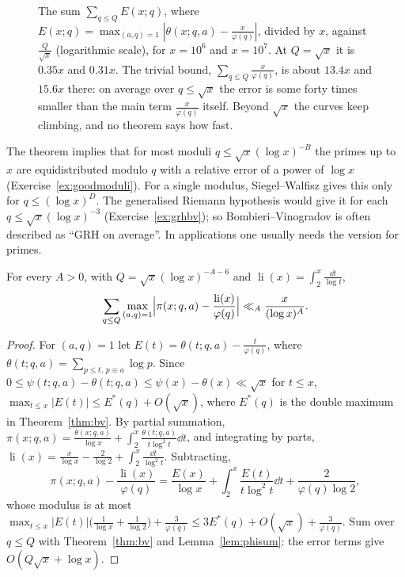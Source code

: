 \begin{figure}[ht]
\centering
{}
\caption{The sum $\sum_{q\le Q}E(x;q)$, where $E(x;q)=\max_{(a,q)=1}|\theta(x;q,a)-\frac x{\varphi(q)}|$, divided by $x$, against $\frac Q{\sqrt x}$ (logarithmic scale), for $x=10^6$ and $x=10^7$. At $Q=\sqrt x$ it is $0.35x$ and $0.31x$. The trivial bound, $\sum_{q\le Q}\frac x{\varphi(q)}$, is about $13.4x$ and $15.6x$ there: on average over $q\le\sqrt x$ the error is some forty times smaller than the main term $\frac x{\varphi(q)}$ itself. Beyond $\sqrt x$ the curves keep climbing, and no theorem says how fast.}
\label{fig:bv}
\end{figure}

The theorem implies that for most moduli $q\le\sqrt x(\log x)^{-B}$ the primes up to $x$ are equidistributed modulo $q$ with a relative error of a power of $\log x$ (Exercise~\ref{ex:goodmoduli}). For a single modulus, Siegel--Walfisz gives this only for $q\le(\log x)^D$. The generalised Riemann hypothesis would give it for each $q\le\sqrt x(\log x)^{-3}$ (Exercise~\ref{ex:grhbv}); so Bombieri--Vinogradov is often described as ``GRH on average''. In applications one usually needs the version for primes.

\begin{corollary}\label{cor:bvpi}
For every $A>0$, with $Q=\sqrt x(\log x)^{-A-6}$ and $\operatorname{li}(x)=\int_2^x\frac{\dd t}{\log t}$,
\[
\sum_{q\le Q}\max_{(a,q)=1}\Bigl|\pi(x;q,a)-\frac{\operatorname{li}(x)}{\varphi(q)}\Bigr|\ll_A\frac x{(\log x)^A}.
\]
\end{corollary}
\begin{proof}
For $(a,q)=1$ let $E(t)=\theta(t;q,a)-\frac t{\varphi(q)}$, where $\theta(t;q,a)=\sum_{p\le t,\,p\equiv a}\log p$. Since $0\le\psi(t;q,a)-\theta(t;q,a)\le\psi(x)-\theta(x)\ll\sqrt x$ for $t\le x$, $\max_{t\le x}|E(t)|\le E^*(q)+O(\sqrt x)$, where $E^*(q)$ is the double maximum in Theorem~\ref{thm:bv}. By partial summation,
$\pi(x;q,a)=\frac{\theta(x;q,a)}{\log x}+\int_2^x\frac{\theta(t;q,a)}{t\log^2t}\dd t$, and integrating by parts, $\operatorname{li}(x)=\frac x{\log x}-\frac2{\log2}+\int_2^x\frac{\dd t}{\log^2t}$. Subtracting,
\[
\pi(x;q,a)-\frac{\operatorname{li}(x)}{\varphi(q)}=\frac{E(x)}{\log x}+\int_2^x\frac{E(t)}{t\log^2t}\dd t+\frac2{\varphi(q)\log2},
\]
whose modulus is at most $\max_{t\le x}|E(t)|\bigl(\frac1{\log x}+\frac1{\log2}\bigr)+\frac3{\varphi(q)}\le3E^*(q)+O(\sqrt x)+\frac3{\varphi(q)}$. Sum over $q\le Q$ with Theorem~\ref{thm:bv} and Lemma~\ref{lem:phisum}: the error terms give $O(Q\sqrt x+\log x)$.
\end{proof}

